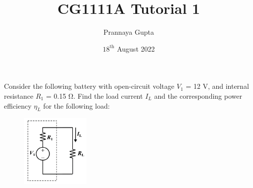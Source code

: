 \documentclass[a4paper, 12pt, addpoints]{exam}
\title{\textbf{CG1111A} Tutorial 1}
\author{Prannaya Gupta}
\date{$18^{\text{th}}$ August 2022}
\begin{document}
\maketitle


\begin{questions}
\question Consider the following battery with open-circuit voltage $V_1$ = 12 V, and internal
resistance $R_1$ = 0.15 Ω. Find the load current $I_L$ and the corresponding power efficiency
$\eta_L$ for the following load:

\begin{figure}[h!]
    \centering
    \includegraphics[width=0.3\textwidth]{images/Q1.png}
\end{figure}

\end{questions}
\end{document}
